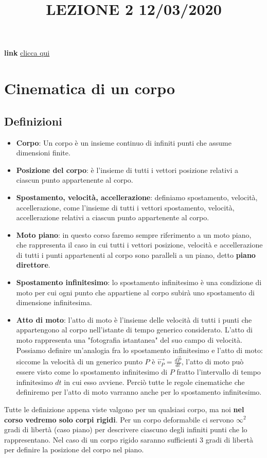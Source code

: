 \title{LEZIONE 2 12/03/2020}\newline
\textbf{link} \href{https://web.microsoftstream.com/video/7f38ca42-5bcf-4a08-b9cf-d42ca1289062}{clicca qui}
\section{Cinematica di un corpo}
\subsection{Definizioni}
\begin{itemize}
    \item \textbf{Corpo}: Un corpo è un insieme continuo di infiniti punti che assume dimensioni finite.
    \item \textbf{Posizione del corpo}: è l'insieme di tutti i vettori posizione relativi a ciascun punto appartenente al corpo.
    \item \textbf{Spostamento, velocità, accellerazione}: definiamo spostamento, velocità, accellerazione, come l'insieme di tutti i vettori spostamento, velocità, accellerazione relativi a ciascun punto appartenente al corpo.
    \item \textbf{Moto piano}: in questo corso faremo sempre riferimento a un moto piano, che rappresenta il caso in cui tutti i vettori posizione, velocità e accellerazione di tutti i punti appartenenti al corpo sono paralleli a un piano, detto \textbf{piano direttore}.
    \item \textbf{Spostamento infinitesimo}: lo spostamento infinitesimo è una condizione di moto per cui ogni punto che appartiene al corpo subirà uno spostamento di dimensione infinitesima.
    \item \textbf{Atto di moto}: l'atto di moto è l'insieme delle velocità di tutti i punti che appartengono al corpo nell'istante di tempo generico considerato. L'atto di moto rappresenta una "fotografia istantanea" del suo campo di velocità. Possiamo definire un'analogia fra lo spostamento infinitesimo e l'atto di moto: siccome la velocità di un generico punto $P$ è $\vec{v_P} = \frac{d \vec{P}}{dt}$, l'atto di moto può essere visto come lo spostamento infinitesimo di $P$ fratto l'intervallo di tempo infinitesimo $dt$ in cui esso avviene. Perciò tutte le regole cinematiche che definiremo per l'atto di moto varranno anche per lo spostamento infinitesimo.
\end{itemize}
Tutte le definizione appena viste valgono per un qualsiasi corpo, ma noi \textbf{nel corso vedremo solo corpi rigidi}.\newline
Per un corpo deformabile ci servono $\infty^2$ gradi di libertà (caso piano) per descrivere ciascuno degli infiniti punti che lo rappresentano.\newline
Nel caso di un corpo rigido saranno sufficienti $3$ gradi di libertà per definire la posizione del corpo nel piano.
